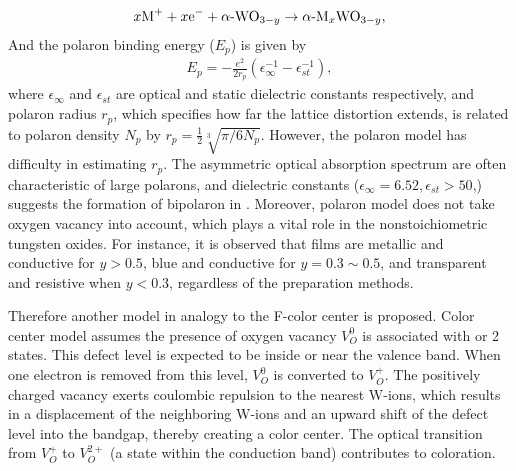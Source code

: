 \begin{align}\label{eq:ec}
x\ce{M+} + x\ce{e-} +  \ce{$\alpha \hyphen$WO$_{3-y}$} \rightarrow \ce{$\alpha \hyphen$M$_x$WO$_{3-y}$},
\end{align}
And the polaron binding energy ($E_p$) is given by
\begin{align}
E_p = - \frac{e^2}{2r_p} (\epsilon_\infty^{-1} - \epsilon_{st}^{-1}),
\end{align}
where $\epsilon_\infty$ and $\epsilon_{st}$ are optical and static dielectric constants respectively, and polaron radius $r_p$, which specifies how far the lattice distortion extends, is related to polaron density $N_p$ by $r_p = \frac{1}{2}\sqrt[3]{\pi/6N_p}$. However, the polaron model has difficulty in estimating $r_p$. The asymmetric optical absorption spectrum are often characteristic of large polarons, and dielectric constants ($\epsilon_\infty = 6.52,\epsilon_{st} > 50$,\cite{Deb2008}) suggests the formation of bipolaron in . Moreover, polaron model does not take oxygen vacancy into account, which plays a vital role in the nonstoichiometric tungsten oxides. For instance, it is observed that  films are metallic and conductive for $y > 0.5$, blue and conductive for $y = 0.3 \sim 0.5$, and transparent and resistive when $y < 0.3$, regardless of the preparation methods.\cite{Chatten2005}

Therefore another model in analogy to the F-color center is proposed. Color center model assumes the presence of oxygen vacancy $V_O^0$ is associated with  or 2 states. This defect level is expected to be inside or near the valence band. When one electron is removed from this level, $V_O^0$ is converted to $V_O^+$. The positively charged vacancy exerts coulombic repulsion to the nearest W-ions, which results in a displacement of the neighboring W-ions and an upward shift of the defect level into the bandgap, thereby creating a color center. The optical transition from $V_O^+$ to $V_O^{2+}$ (a state within the conduction band) contributes to coloration.\cite{Deb2008}

